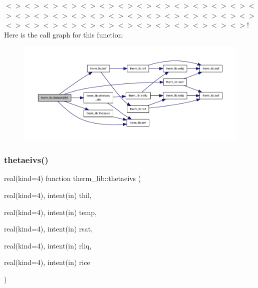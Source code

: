 $<$$>$$<$$>$$<$$>$$<$$>$$<$$>$$<$$>$$<$$>$$<$$>$$<$$>$$<$$>$$<$$>$$<$$>$$<$$>$$<$$>$$<$$>$$<$$>$$<$$>$$<$$>$$<$$>$$<$$>$$<$$>$$<$$>$$<$$>$$<$$>$$<$$>$$<$$>$$<$$>$$<$$>$$<$$>$$<$$>$$<$$>$$<$$>$$<$$>$$<$$>$$<$$>$$<$$>$$<$$>$$<$$>$$<$$>$$<$$>$! Here is the call graph for this function\+:
\nopagebreak
\begin{figure}[H]
\begin{center}
\leavevmode
\includegraphics[width=350pt]{namespacetherm__lib_a567e8e6a001cab2a0991a88f7b7fc28f_cgraph}
\end{center}
\end{figure}
\mbox{\label{namespacetherm__lib_a59bae4be9ba9f862c7b58953f37a9be2}} 
\subsubsection{\texorpdfstring{thetaeivs()}{thetaeivs()}}
{\footnotesize\ttfamily real(kind=4) function therm\+\_\+lib\+::thetaeivs (\begin{DoxyParamCaption}\item[{real(kind=4), intent(in)}]{thil,  }\item[{real(kind=4), intent(in)}]{temp,  }\item[{real(kind=4), intent(in)}]{rsat,  }\item[{real(kind=4), intent(in)}]{rliq,  }\item[{real(kind=4), intent(in)}]{rice }\end{DoxyParamCaption})}


